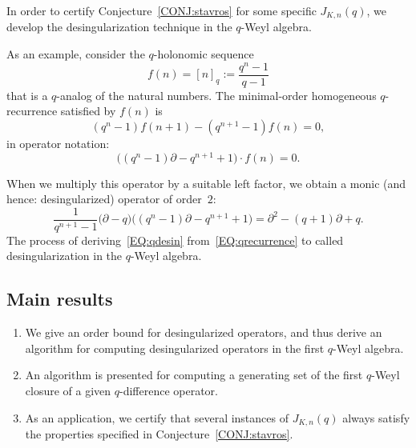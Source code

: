 \documentclass[10pt,a4paper]{article}
\newcommand{\pa}{ {\partial}}
\begin{document}
In order to certify Conjecture~\ref{CONJ:stavros} for some specific $J_{K,n}(q)$, 
we develop the desingularization technique in the $q$-Weyl algebra. 

As an example, consider the $q$-holonomic sequence
\[
  f(n) = [n]_q := \frac{q^n-1}{q-1}
\]
that is a $q$-analog of the natural numbers.  The minimal-order homogeneous
$q$-recurrence satisfied by $f(n)$ is
\[
  (q^n-1)f(n+1) - (q^{n+1}-1)f(n) = 0,
\]
in operator notation:
\begin{equation} \label{EQ:qrecurrence}
 \bigl((q^n-1)\pa - q^{n+1} + 1\bigr) \cdot f(n) = 0.
\end{equation}

When we multiply this operator by a suitable left factor, we obtain
a monic (and hence: desingularized) operator of order~$2$:
\begin{equation} \label{EQ:qdesin}
  \frac{1}{q^{n+1}-1}\bigl(\pa - q\bigr)\bigl((q^n-1)\pa - q^{n+1} + 1\bigr) =
  \pa^2 - (q+1)\pa + q.
\end{equation}
The process of deriving~\eqref{EQ:qdesin} from~\eqref{EQ:qrecurrence} to called desingularization in the $q$-Weyl algebra.


\subsection{Main results}

\begin{enumerate}
 \item We give an order bound for desingularized operators, and thus derive
an algorithm for computing desingularized operators in the first $q$-Weyl
algebra.
 \item An algorithm is presented for computing a generating set
of the first $q$-Weyl closure of a given $q$-difference operator.
 \item As an application, we certify that several instances of $J_{K,n}(q)$ always 
 satisfy the properties specified in Conjecture~\ref{CONJ:stavros}.  
\end{enumerate}
\end{document}
